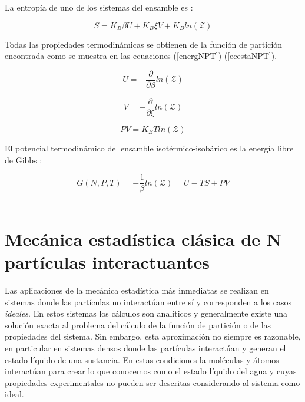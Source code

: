 La entropía de uno de los sistemas del ensamble es \cite{mcquarrie1976}:

\begin{equation} \label{entrpnpt}
    S = K_{B}\beta U + K_{B}\xi V + K_{B}ln(\mathcal{Z})
\end{equation}

Todas las propiedades termodinámicas se obtienen de la función de partición encontrada como se muestra en las ecuaciones (\ref{energNPT})-(\ref{ecestaNPT}).

\begin{equation} \label{energNPT}
    U=-\frac{\partial}{\partial \beta}ln(\mathcal{Z})
\end{equation}

\begin{equation} \label{volNPT}
    V=-\frac{\partial}{\partial \xi}ln(\mathcal{Z})
\end{equation}

\begin{equation} \label{ecestaNPT}
    PV=K_{B}Tln(\mathcal{Z})
\end{equation}

El potencial termodinámico del ensamble isotérmico-isobárico es la energía libre de Gibbs \cite{mcquarrie1976}:

\begin{equation} \label{potgibbs}
    G(N,P,T)=-\frac{1}{\beta}ln(\mathcal{Z})=U-TS+PV
\end{equation}\\

\section{Mecánica estadística clásica de N partículas interactuantes} \label{MecClasNpart}

Las aplicaciones de la mecánica estadística más inmediatas se realizan en sistemas donde las partículas no interactúan entre sí y corresponden a los casos \textit{ideales}. En estos sistemas los cálculos son analíticos y generalmente existe una solución exacta al problema del cálculo de la función de partición o de las propiedades del sistema. Sin embargo, esta aproximación no siempre es razonable, en particular en sistemas densos donde las partículas interactúan y generan el estado líquido de una sustancia. En estas condiciones la moléculas y átomos interactúan para crear lo que conocemos como el estado líquido del agua y cuyas propiedades experimentales no pueden ser descritas considerando al sistema como ideal.\\

